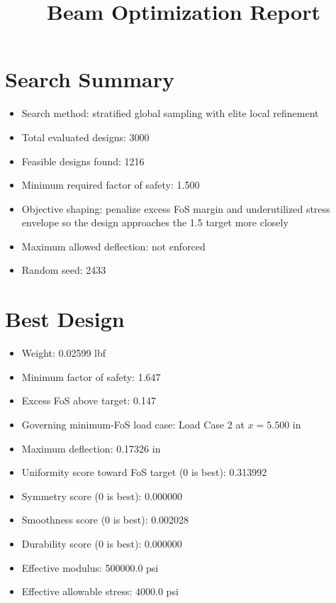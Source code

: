 \documentclass[11pt]{article}
\title{Beam Optimization Report}
\date{}
\begin{document}
\maketitle

\section*{Search Summary}
\begin{itemize}
\item Search method: stratified global sampling with elite local refinement
\item Total evaluated designs: 3000
\item Feasible designs found: 1216
\item Minimum required factor of safety: 1.500
\item Objective shaping: penalize excess FoS margin and underutilized stress envelope so the design approaches the 1.5 target more closely
\item Maximum allowed deflection: not enforced
\item Random seed: 2433
\end{itemize}

\section*{Best Design}
\begin{itemize}
\item Weight: 0.02599 lbf
\item Minimum factor of safety: 1.647
\item Excess FoS above target: 0.147
\item Governing minimum-FoS load case: Load Case 2 at $x=5.500$ in
\item Maximum deflection: 0.17326 in
\item Uniformity score toward FoS target (0 is best): 0.313992
\item Symmetry score (0 is best): 0.000000
\item Smoothness score (0 is best): 0.002028
\item Durability score (0 is best): 0.000000
\item Effective modulus: 500000.0 psi
\item Effective allowable stress: 4000.0 psi
\end{itemize}
\end{document}
